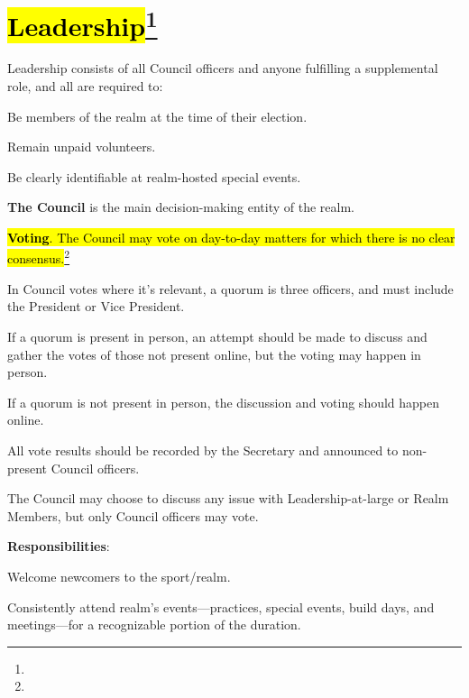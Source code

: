 \documentclass[12pt]{article}
\newcommand{\newpart}[2][]{\hl{#2}\expandafter\ifx\expandafter\relax\detokenize{#1}\relax\else\textnormal{\footnote{#1}}\fi}
\begin{document}
\section{\newpart{Leadership}}\label{leadership}
\begin{level}
    \item Leadership consists of all Council officers and anyone fulfilling a supplemental role, and all are required to:
    \begin{level}
        \item Be members of the realm at the time of their election.
        \item Remain unpaid volunteers.
        \item Be clearly identifiable at realm-hosted special events.
    \end{level}
    \item \textbf{The Council} is the main decision-making entity of the realm.\label{the_council}
    \begin{level}
        \item \newpart{\textbf{Voting}. The Council may vote on day-to-day matters for which there is no clear consensus.}
        \begin{level}
            \item In Council votes where it's relevant, a quorum is three officers, and must include the President or Vice President. 
            \item If a quorum is present in person, an attempt should be made to discuss and gather the votes of those not present online, but the voting may happen in person.
            \item If a quorum is not present in person, the discussion and voting should happen online.
            \item All vote results should be recorded by the Secretary and announced to non-present Council officers. 
            \item The Council may choose to discuss any issue with Leadership-at-large or Realm Members, but only Council officers may vote.
        \end{level}
        \item \textbf{Responsibilities}:
        \begin{level}
            \item Welcome newcomers to the sport/realm.
            \item Consistently attend realm's events---practices, special events, build days, and meetings---for a recognizable portion of the duration. 

\end{level}
\end{level}
\end{level}
\end{document}
